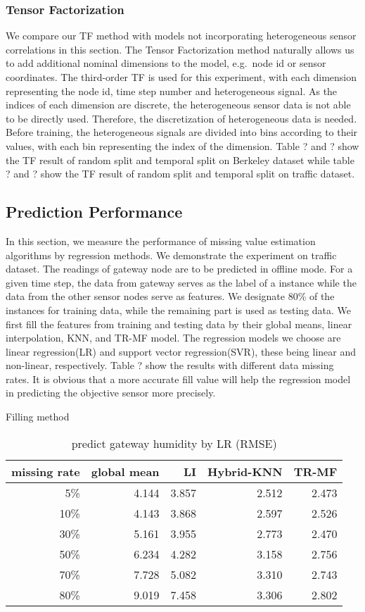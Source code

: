\subsubsection{Tensor Factorization} %
We compare our TF method with models not incorporating heterogeneous sensor correlations in this section.
The Tensor Factorization method naturally allows us to add additional nominal dimensions to the model, e.g.\ node id or sensor coordinates.
The third-order TF is used for this experiment, with each dimension representing the node id, time step number and heterogeneous signal.  
As the indices of each dimension are discrete, the heterogeneous sensor data is not able to be directly used.
Therefore, the discretization of heterogeneous data is needed.
Before training, the heterogeneous signals are divided into bins according to their values, with each bin representing the index of the dimension.
Table ? and ? show the TF result of random split and temporal split on Berkeley dataset while table ? and ? show the TF result of random split and temporal split on traffic dataset.

\subsection{Prediction Performance}
In this section, we measure the performance of missing value estimation algorithms by regression methods.
We demonstrate the experiment on traffic dataset.
The readings of gateway node are to be predicted in offline mode.
For a given time step, the data from gateway serves as the label of a instance while the data from the other sensor nodes serve as features.
We designate 80\% of the instances for training data, while the remaining part is used as testing data.
We first fill the features from training and testing data by their global means, linear interpolation, KNN, and TR-MF model.
The regression models we choose are linear regression(LR) and support vector regression(SVR), these being linear and non-linear, respectively.
Table ? show the results with different data missing rates.
It is obvious that a more accurate fill value will help the regression model in predicting the objective sensor more precisely.

\begin{table} [htbp]
\centering
\caption{predict gateway humidity by LR (RMSE) }
\label{table: LR}
   Filling method
\begin{tabular}{ r | r r r r}
        missing rate&global mean     &LI   &Hybrid-KNN &TR-MF\\ \hline
        5\%      &4.144&3.857&2.512&2.473\\
        10\%    &4.143&3.868& 2.597&2.526\\
        30\%    &5.161&3.955&2.773&2.470\\
        50\%    &6.234&4.282&3.158&2.756\\
        70\%   &7.728&5.082&3.310&2.743\\
        80\%   &9.019&7.458&3.306&2.802\\
\end{tabular}
\end{table}

